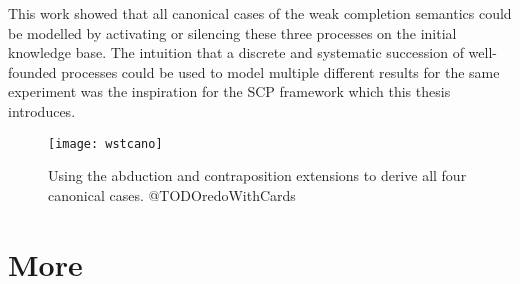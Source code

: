 This work showed that all canonical cases of the weak completion semantics could be modelled by activating or silencing these three processes on the initial knowledge base. The intuition that a discrete and systematic succession of well-founded processes could be used to model multiple different results for the same experiment was the inspiration for the SCP framework which this thesis introduces.


\begin{figure}
\centering \texttt{[image: wstcano]}
\caption{Using the abduction and contraposition extensions to derive all four canonical cases. @TODOredoWithCards}
\label{fig:wstcano}
\end{figure}








\section{More}